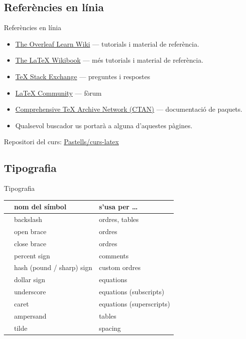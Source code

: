 \subsection{Referències en línia}
\begin{frame}{Referències en línia}
\begin{itemize}
\item \href{https://www.overleaf.com/learn}{The Overleaf Learn Wiki} --- tutorials i material de referència.
\item \href{http://en.wikibooks.org/wiki/LaTeX}{The \LaTeX{} Wikibook} --- més tutorials i material de referència.
\item \href{http://tex.stackexchange.com/}{\TeX{} Stack Exchange} --- preguntes i respostes 
\item \href{http://www.latex-community.org/}{\LaTeX{} Community} --- fòrum 
\item \href{http://ctan.org/}{Comprehensive \TeX{} Archive Network (CTAN)} --- documentació de paquets.
\item Qualsevol buscador us portarà a alguna d'aquestes pàgines.
\end{itemize}

Repositori del curs: \href{https://github.com/Pastells/curs-latex}{Pastells/curs-latex}
\end{frame}



\subsection{Tipografia}
\begin{frame}{Tipografia}
\begin{tabular}{lll}
& nom del símbol & s'usa per \dots \\\hline
\bftt{\bs} & backslash                 & ordres, tables \\
\bftt{\{}  & open brace                & ordres \\
\bftt{\}}  & close brace               & ordres \\
\bftt{\%}  & percent sign              & comments \\
\bftt{\#}  & hash (pound / sharp) sign & custom ordres \\
\bftt{\$}  & dollar sign               & equations \\
\bftt{\_}  & underscore                & equations (subscripts) \\
\bftt{\^}  & caret                     & equations (superscripts) \\
\bftt{\&}  & ampersand                 & tables \\
\bftt{\~}  & tilde                     & spacing \\
\end{tabular}
\end{frame}

